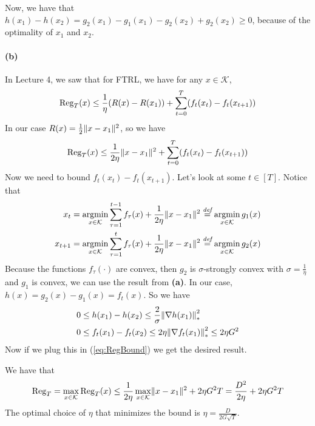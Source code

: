 \documentclass{article}
\DeclareMathOperator*{\argmin}{argmin}
\DeclarePairedDelimiter\br{(}{)}%
\DeclarePairedDelimiter\norm{\lVert}{\rVert}%
\newcommand{\textrel}[2]{\stackrel{\textit{\text{#1}}}{#2} }
\newcommand{\Kcal}{\mathcal{K}}
\newcommand{\Reg}{\text{Reg}}
\begin{document}
Now, we have that $h(x_1)-h(x_2) = g_2(x_1)-g_1(x_1)-g_2(x_2)+g_2(x_2) \geq 0$, because of the optimality of $x_1$ and $x_2$.

\paragraph{(b)}
In Lecture 4, we saw that for FTRL, we have for any $x \in \Kcal$,
\begin{align*} 
    \Reg_T(x) \leq \frac{1}{\eta} \br*{R(x)-R(x_1)} + \sum_{t=0}^{T} \br*{f_t(x_t) - f_t(x_{t+1})}
\end{align*}
In our case $R(x)= \frac{1}{2} \norm{x-x_1}^2$, so we have
\begin{align} \label{eq:RegBound}
    \Reg_T(x) \leq \frac{1}{2 \eta} \norm{x-x_1}^2 + \sum_{t=0}^{T} \br*{f_t(x_t) - f_t(x_{t+1})}
\end{align}
Now we need to bound $f_t(x_t) - f_t(x_{t+1})$.
Let's look at some $t \in [T]$.
Notice that
\begin{align*}
    x_t &= \argmin_{x \in \Kcal} \sum_{\tau=1}^{t-1} f_\tau(x) + \frac{1}{2\eta} \norm{x-x_1}^2 \textrel{def}{=}  \argmin_{x \in \Kcal} g_1(x)\\
        x_{t+1} &= \argmin_{x \in \Kcal} \sum_{\tau=1}^{t} f_\tau(x) + \frac{1}{2\eta} \norm{x-x_1}^2 \textrel{def}{=} \argmin_{x \in \Kcal} g_2(x) 
\end{align*}
Because the functions $f_\tau(\cdot)$ are convex, then $g_2$ is $\sigma$-strongly convex with $\sigma = \frac{1}{\eta}$ and $g_1$ is convex, we can use the result from \textbf{(a)}.
In our case, $h(x) = g_2(x)-g_1(x) = f_t(x)$.
So we have  
\begin{align*}
    0  &\leq h(x_1)-h(x_2)\leq \frac{2}{\sigma} \norm*{\nabla h(x_1)}^2_{*} \\
    0 &\leq f_t(x_1)-f_t(x_2) \leq 2 \eta \norm*{\nabla f_t(x_1)}^2_{*} \leq   2 \eta  G^2 \\
\end{align*}
Now if we plug this in (\ref{eq:RegBound}) we get the desired result.

We have that 
\begin{align*}
    \Reg_T = \max_{x \in \Kcal} \Reg_T(x) \leq \frac{1}{2 \eta} \max_{x \in \Kcal} \norm{x-x_1}^2 +  2 \eta  G^2 T =  \frac{D^2}{2\eta} + 2 \eta  G^2 T
\end{align*}
The optimal choice of $\eta$ that minimizes the bound is 
$\eta = \frac{D}{2 G \sqrt{T}}$.
\end{document}
